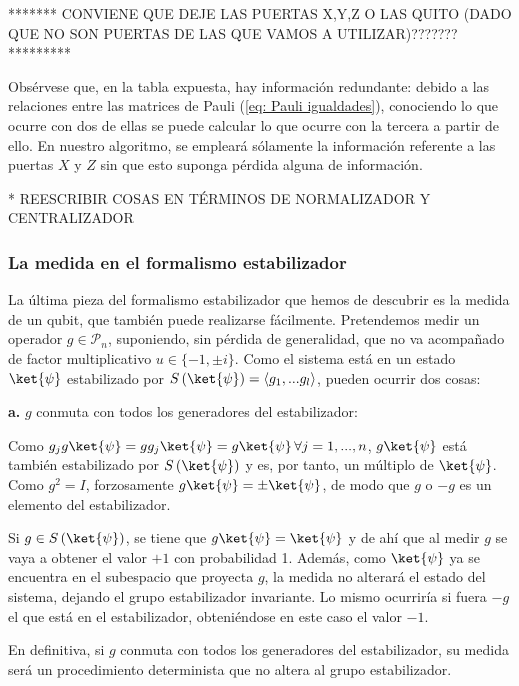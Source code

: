 \documentclass[11pt,a4paper,twoside,pdf]{article}
\numberwithin{equation}{section}
\begin{document}
		******* CONVIENE QUE DEJE LAS PUERTAS X,Y,Z O LAS QUITO (DADO QUE NO SON PUERTAS DE LAS QUE VAMOS A UTILIZAR)??????? *********
	
		Obsérvese que, en la tabla expuesta, hay información redundante: debido a las relaciones entre las matrices de Pauli (\ref{eq: Pauli igualdades}), conociendo lo que ocurre con dos de ellas se puede calcular lo que ocurre con la tercera a partir de ello. En nuestro algoritmo, se empleará sólamente la información referente a las puertas $X$ y $Z$ sin que esto suponga pérdida alguna de información.
	
	
			* REESCRIBIR COSAS EN TÉRMINOS DE NORMALIZADOR Y CENTRALIZADOR
			
		\subsubsection{La medida en el formalismo estabilizador}\label{subsubsec: medida}
	
		La última pieza del formalismo estabilizador que hemos de descubrir es la medida de un qubit, que también puede realizarse fácilmente. Pretendemos medir un operador $g \in \mathcal{P}_n$, suponiendo, sin pérdida de generalidad, que no va acompañado de factor multiplicativo $u\in\{-1,\pm i\}$. Como el sistema está en un estado $\ket{\psi}$ estabilizado por $S\left( \ket{\psi}\right) = \left\langle g_1,...g_l\right\rangle$, pueden ocurrir dos cosas:
		
			\begin{flushleft}\textbf{a.} $g$ conmuta con todos los generadores del estabilizador:	\end{flushleft} 
			
			Como $g_jg\ket{\psi}=gg_j\ket{\psi}=g\ket{\psi} \, \forall j=1,...,n$, $g\ket{\psi}$ está también estabilizado por $S\left( \ket{\psi}\right) $ y es, por tanto, un múltiplo de $\ket{\psi}$. Como $g^2=I$, forzosamente $g\ket{\psi}=\pm\ket{\psi}$, de modo que $g$ o $-g$ es un elemento del estabilizador.
			
			Si $g\in S\left( \ket{\psi}\right) $, se tiene que $g\ket{\psi}=\ket{\psi}$ y de ahí que al medir $g$ se vaya a obtener el valor $+1$ con probabilidad 1. Además, como $\ket{\psi}$ ya se encuentra en el subespacio que proyecta $g$, la medida no alterará el estado del sistema, dejando el grupo estabilizador invariante. Lo mismo ocurriría si fuera $-g$ el que está en el estabilizador, obteniéndose en este caso el valor $-1$.
			
			En definitiva, si $g$ conmuta con todos los generadores del estabilizador, su medida será un procedimiento determinista que no altera al grupo estabilizador.
			
\end{document}
